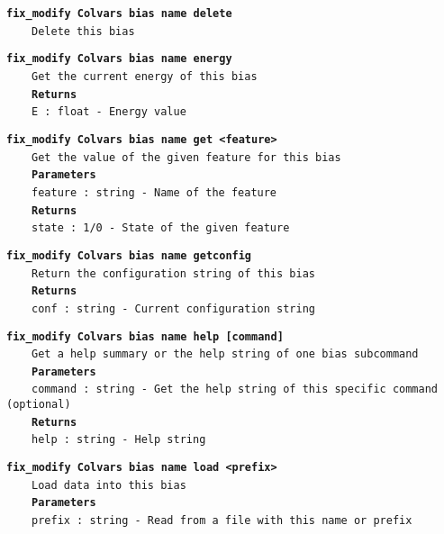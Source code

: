 \begin{mdexampleinput}{}
\texttt{\textbf{fix\_modify Colvars bias name delete}}
\\
\-~~~~\texttt{Delete this bias}
\end{mdexampleinput}
\begin{mdexampleinput}{}
\texttt{\textbf{fix\_modify Colvars bias name energy}}
\\
\-~~~~\texttt{Get the current energy of this bias}
\\
\-~~~~\texttt{\textbf{Returns}}
\\
\-~~~~\texttt{E : float - Energy value}
\end{mdexampleinput}
\begin{mdexampleinput}{}
\texttt{\textbf{fix\_modify Colvars bias name get <feature>}}
\\
\-~~~~\texttt{Get the value of the given feature for this bias}
\\
\-~~~~\texttt{\textbf{Parameters}}
\\
\-~~~~\texttt{feature : string - Name of the feature}
\\
\-~~~~\texttt{\textbf{Returns}}
\\
\-~~~~\texttt{state : 1/0 - State of the given feature}
\end{mdexampleinput}
\begin{mdexampleinput}{}
\texttt{\textbf{fix\_modify Colvars bias name getconfig}}
\\
\-~~~~\texttt{Return the configuration string of this bias}
\\
\-~~~~\texttt{\textbf{Returns}}
\\
\-~~~~\texttt{conf : string - Current configuration string}
\end{mdexampleinput}
\begin{mdexampleinput}{}
\texttt{\textbf{fix\_modify Colvars bias name help [command]}}
\\
\-~~~~\texttt{Get a help summary or the help string of one bias subcommand}
\\
\-~~~~\texttt{\textbf{Parameters}}
\\
\-~~~~\texttt{command : string - Get the help string of this specific command (optional)}
\\
\-~~~~\texttt{\textbf{Returns}}
\\
\-~~~~\texttt{help : string - Help string}
\end{mdexampleinput}
\begin{mdexampleinput}{}
\texttt{\textbf{fix\_modify Colvars bias name load <prefix>}}
\\
\-~~~~\texttt{Load data into this bias}
\\
\-~~~~\texttt{\textbf{Parameters}}
\\
\-~~~~\texttt{prefix : string - Read from a file with this name or prefix}
\end{mdexampleinput}

